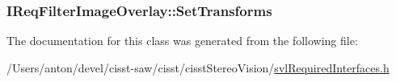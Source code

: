 \subsubsection[{Set\+Transforms}]{ I\+Req\+Filter\+Image\+Overlay\+::\+Set\+Transforms}\label{class_i_req_filter_image_overlay_a23171709938c0c03dfe317aca65bb75b}


The documentation for this class was generated from the following file\+:\begin{DoxyCompactItemize}
\item 
/\+Users/anton/devel/cisst-\/saw/cisst/cisst\+Stereo\+Vision/\hyperlink{svl_required_interfaces_8h}{svl\+Required\+Interfaces.\+h}\end{DoxyCompactItemize}
